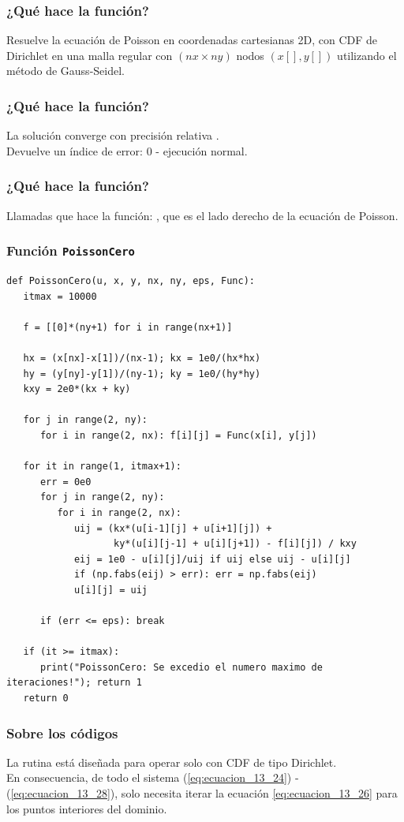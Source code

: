 \documentclass[12pt]{beamer}
\begin{document}
\begin{frame}
\frametitle{¿Qué hace la función?}
Resuelve la ecuación de Poisson en coordenadas cartesianas 2D, con CDF de Dirichlet en una malla regular con $(nx \times ny)$ nodos $(x[ ], y[ ])$ utilizando el método de Gauss-Seidel.
\end{frame}
\begin{frame}
\frametitle{¿Qué hace la función?}
La solución  converge con precisión relativa .
\\
\bigskip
\pause
Devuelve un índice de error: $0$ - ejecución normal.
\end{frame}
\begin{frame}
\frametitle{¿Qué hace la función?}
Llamadas que hace la función: , \pause que es el lado derecho de la ecuación de Poisson.
\end{frame}
\begin{frame}
\frametitle{Función \texttt{PoissonCero}}
\begin{lstlisting}[caption=Código para la función \texttt{PoissonCero}]
def PoissonCero(u, x, y, nx, ny, eps, Func):
   itmax = 10000

   f = [[0]*(ny+1) for i in range(nx+1)]

   hx = (x[nx]-x[1])/(nx-1); kx = 1e0/(hx*hx)
   hy = (y[ny]-y[1])/(ny-1); ky = 1e0/(hy*hy) 
   kxy = 2e0*(kx + ky)

   for j in range(2, ny):
      for i in range(2, nx): f[i][j] = Func(x[i], y[j])

   for it in range(1, itmax+1):
      err = 0e0
      for j in range(2, ny):
         for i in range(2, nx):
            uij = (kx*(u[i-1][j] + u[i+1][j]) +
                   ky*(u[i][j-1] + u[i][j+1]) - f[i][j]) / kxy
            eij = 1e0 - u[i][j]/uij if uij else uij - u[i][j]
            if (np.fabs(eij) > err): err = np.fabs(eij)
            u[i][j] = uij

      if (err <= eps): break

   if (it >= itmax):
      print("PoissonCero: Se excedio el numero maximo de iteraciones!"); return 1
   return 0
\end{lstlisting}
\end{frame}
\begin{frame}
\frametitle{Sobre los códigos}
La rutina  está diseñada para operar solo con CDF de tipo Dirichlet.
\\
\bigskip
\pause
En consecuencia, de todo el sistema (\ref{eq:ecuacion_13_24}) - (\ref{eq:ecuacion_13_28}), solo necesita iterar la ecuación \ref{eq:ecuacion_13_26} para los puntos interiores del dominio.
\end{frame}
\end{document}
